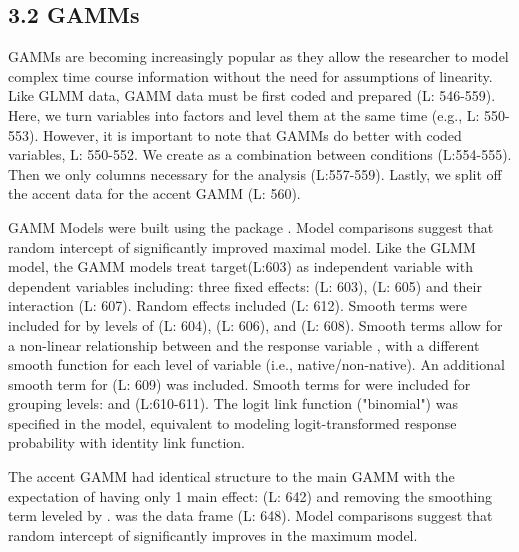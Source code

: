 

\subsection{3.2 GAMMs}
GAMMs are becoming increasingly popular as they allow the researcher to model complex time course information without the need for assumptions of linearity. Like GLMM data, GAMM data must be first coded and prepared (L: 546-559). Here, we turn variables into factors and level them at the same time (e.g., L: 550-553). However, it is important to note that GAMMs do better with coded variables, L: 550-552. We create  as a combination between conditions (L:554-555). Then we only  columns necessary for the analysis (L:557-559). Lastly, we split off the accent data for the accent GAMM (L: 560).



GAMM Models were built using the  package \parencite{mgcv_wood_2017}. Model comparisons suggest that random intercept of  significantly improved maximal model. Like the GLMM model, the GAMM models treat target(L:603) as independent variable with dependent variables including: three fixed effects:  (L: 603),  (L: 605) and their interaction (L: 607). Random effects included  (L: 612). Smooth terms were included for  by levels of  (L: 604),  (L: 606), and  (L: 608). Smooth terms allow for a non-linear relationship between  and the response variable , with a different smooth function for each level of variable (i.e., native/non-native). An additional smooth term for  (L: 609) was included. Smooth terms for  were included for grouping levels:  and  (L:610-611). The logit link function ("binomial") was specified in the model, equivalent to modeling logit-transformed response probability with identity link function. 



The accent GAMM had identical structure to the main GAMM with the expectation of having only 1 main effect:  (L: 642) and removing the smoothing term leveled by .  was the data frame (L: 648). Model comparisons suggest that random intercept of  significantly improves in the maximum model.

